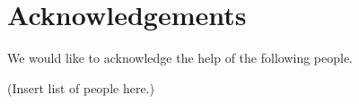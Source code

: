 \chapter*{Acknowledgements}\label{chapacknowledgements}
%
%
\setfooter{\thepage}{}{}{}{}{\thepage}%

We would like to acknowledge the help of the following people.

(Insert list of people here.)

